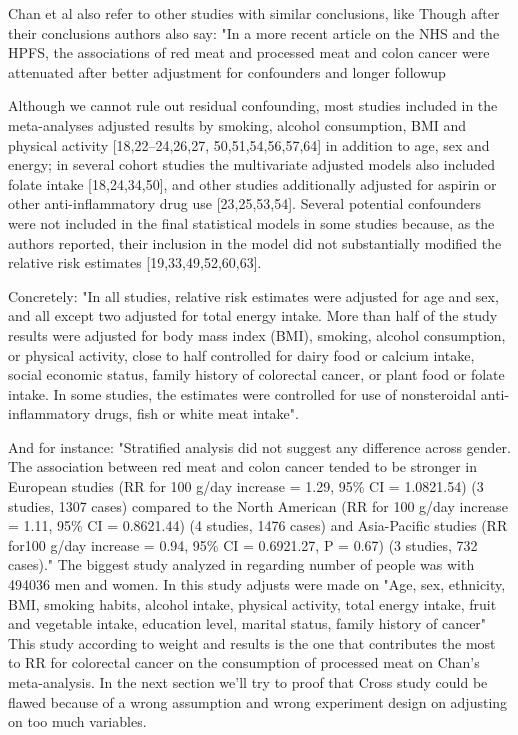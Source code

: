 \documentclass{article}
\begin{document}
Chan et al also refer to other studies with similar conclusions, like \cite{aicr,wei2009}
Though after their conclusions authors also say: "In a more recent article on the NHS and the HPFS, the
associations of red meat and processed meat and colon cancer were
attenuated after better adjustment for confounders and longer followup \cite{wei}


Although we cannot rule out residual confounding, most studies
included in the meta-analyses adjusted results by smoking, alcohol
consumption, BMI and physical activity [18,22–24,26,27,
50,51,54,56,57,64] in addition to age, sex and energy; in several
cohort studies the multivariate adjusted models also included folate
intake [18,24,34,50], and other studies additionally adjusted for
aspirin or other anti-inflammatory drug use [23,25,53,54]. Several
potential confounders were not included in the final statistical
models in some studies because, as the authors reported, their
inclusion in the model did not substantially modified the relative
risk estimates [19,33,49,52,60,63].

Concretely: "In all studies, relative risk estimates were adjusted for age and
sex, and all except two adjusted for total energy intake. More than
half of the study results were adjusted for body mass index (BMI),
smoking, alcohol consumption, or physical activity, close to half
controlled for dairy food or calcium intake, social economic status,
family history of colorectal cancer, or plant food or folate intake.
In some studies, the estimates were controlled for use of nonsteroidal
anti-inflammatory drugs, fish or white meat intake".

And for instance: "Stratified analysis did not suggest any difference across gender. The
association between red meat and colon cancer tended to be stronger
in European studies (RR for 100 g/day increase = 1.29, 95\% CI =
1.0821.54) (3 studies, 1307 cases) compared to the North American
(RR for 100 g/day increase = 1.11, 95\% CI = 0.8621.44) (4 studies, 1476
cases) and Asia-Pacific studies (RR for100 g/day increase = 0.94, 95\% CI =
0.6921.27, P = 0.67) (3 studies, 732 cases)."
The biggest study analyzed in \cite{chan} regarding number of people was \cite{cross} with 494036 men and women. In this study adjusts were made on "Age, sex, ethnicity, BMI, smoking habits, alcohol intake, physical activity, total energy intake, fruit and vegetable intake, education level, marital status, family history of cancer"
This study according to weight and results is the one that contributes the most to RR for colorectal cancer on the consumption of processed meat on Chan's meta-analysis. In the next section we'll try to proof that Cross study could be flawed because of a wrong assumption and wrong experiment design on adjusting on too much variables.
\end{document}
